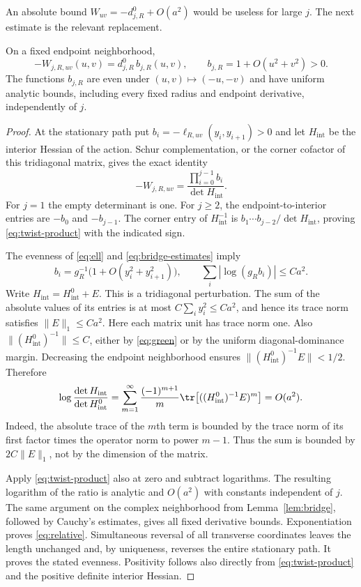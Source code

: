 An absolute bound $W_{uv}=-d^0_{j,R}+O(a^2)$ would be useless for large
$j$. The next estimate is the relevant replacement.

\begin{lemma}\label{lem:relative}
On a fixed endpoint neighborhood,
\begin{equation}\label{eq:relative}
 -W_{j,R,uv}(u,v)=d^0_{j,R}\,b_{j,R}(u,v),\qquad
 b_{j,R}=1+O(u^2+v^2)>0.
\end{equation}
The functions $b_{j,R}$ are even under $(u,v)\mapsto(-u,-v)$ and
have uniform analytic bounds, including every fixed radius and endpoint
derivative, independently of $j$.
\end{lemma}
\begin{proof}
At the stationary path put
$b_i=-\ell_{R,uv}(y_i,y_{i+1})>0$ and let $H_{\mathrm{int}}$ be the
interior Hessian of the action. Schur complementation, or the corner
cofactor of this tridiagonal matrix, gives the exact identity
\begin{equation}\label{eq:twist-product}
 -W_{j,R,uv}=\frac{\prod_{i=0}^{j-1}b_i}{\det H_{\mathrm{int}}}.
\end{equation}
For $j=1$ the empty determinant is one. For $j\ge2$, the endpoint-to-interior
entries are $-b_0$ and $-b_{j-1}$. The corner entry of
$H_{\mathrm{int}}^{-1}$ is
$b_1\cdots b_{j-2}/\det H_{\mathrm{int}}$, proving
\eqref{eq:twist-product} with the indicated sign.

The evenness of \eqref{eq:ell} and \eqref{eq:bridge-estimates} imply
\[
 b_i=g_R^{-1}\bigl(1+O(y_i^2+y_{i+1}^2)\bigr),\qquad
 \sum_i|\log(g_Rb_i)|\le C a^2.
\]
Write $H_{\mathrm{int}}=H^0_{\mathrm{int}}+E$. This is a tridiagonal
perturbation. The sum of the absolute values of its entries is at most
$C\sum_i y_i^2\le Ca^2$, and hence its trace norm satisfies
$\|E\|_1\le Ca^2$. Here each matrix unit has trace norm one.
Also $\|(H^0_{\mathrm{int}})^{-1}\|\le C$, either by
\eqref{eq:green} or by the uniform diagonal-dominance margin.
Decreasing the endpoint neighborhood ensures
$\|(H^0_{\mathrm{int}})^{-1}E\|<1/2$. Therefore
\begin{equation}\label{eq:log-det}
 \log\frac{\det H_{\mathrm{int}}}{\det H^0_{\mathrm{int}}}
 =\sum_{m=1}^\infty\frac{(-1)^{m+1}}m
      \tr\bigl[((H^0_{\mathrm{int}})^{-1}E)^m\bigr]=O(a^2).
\end{equation}
Indeed, the absolute trace of the $m$th term is bounded by the
trace norm of its first factor times the operator norm to power $m-1$.
Thus the sum is bounded by $2C\|E\|_1$, not by the dimension of the matrix.

Apply \eqref{eq:twist-product} also at zero and subtract logarithms.
The resulting logarithm of the ratio is analytic and $O(a^2)$ with
constants independent of $j$. The same argument on the complex
neighborhood from Lemma~\ref{lem:bridge}, followed by Cauchy's estimates,
gives all fixed derivative bounds. Exponentiation proves
\eqref{eq:relative}. Simultaneous reversal of all transverse coordinates
leaves the length unchanged and, by uniqueness, reverses the entire
stationary path. It proves the stated evenness. Positivity follows
also directly from \eqref{eq:twist-product} and the positive definite
interior Hessian.
\end{proof}

